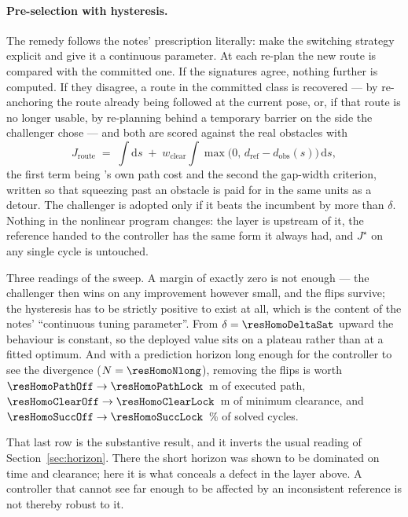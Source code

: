 \paragraph{Pre-selection with hysteresis.}
The remedy follows the notes' prescription literally: make the switching strategy explicit and give it a
continuous parameter. At each re-plan the new \astar{} route is compared with the committed one. If the
signatures agree, nothing further is computed. If they disagree, a route in the committed class is recovered
--- by re-anchoring the route already being followed at the current pose, or, if that route is no longer
usable, by re-planning behind a temporary barrier on the side the challenger chose --- and both are scored
against the real obstacles with
%
\begin{equation}
  J_{\text{route}} \;=\; \int \mathrm{d}s \;+\; w_{\text{clear}} \int \max\!\big(0,\, d_{\text{ref}} -
  d_{\text{obs}}(s)\big)\,\mathrm{d}s ,
  \label{eq:routescore}
\end{equation}
%
the first term being \astar{}'s own path cost and the second the gap-width criterion, written so that
squeezing past an obstacle is paid for in the same units as a detour. The challenger is adopted only if it
beats the incumbent by more than $\delta$. Nothing in the nonlinear program changes: the layer is upstream of
it, the reference handed to the controller has the same form it always had, and $J^\star$ on any single cycle
is untouched.


Three readings of the sweep. A margin of exactly zero is not enough --- the challenger then wins on any
improvement however small, and the flips survive; the hysteresis has to be strictly positive to exist at all,
which is the content of the notes' ``continuous tuning parameter''. From $\delta=\resHomoDeltaSat$ upward the
behaviour is constant, so the deployed value sits on a plateau rather than at a fitted optimum. And with a
prediction horizon long enough for the controller to see the divergence
($N=\resHomoNlong$), removing the flips is worth $\resHomoPathOff \to \resHomoPathLock$~m of executed path,
$\resHomoClearOff \to \resHomoClearLock$~m of minimum clearance, and $\resHomoSuccOff \to
\resHomoSuccLock$~\% of solved cycles.

That last row is the substantive result, and it inverts the usual reading of Section~\ref{sec:horizon}. There
the short horizon was shown to be dominated on time and clearance; here it is what conceals a defect in the
layer above. A controller that cannot see far enough to be affected by an inconsistent reference is not
thereby robust to it.


